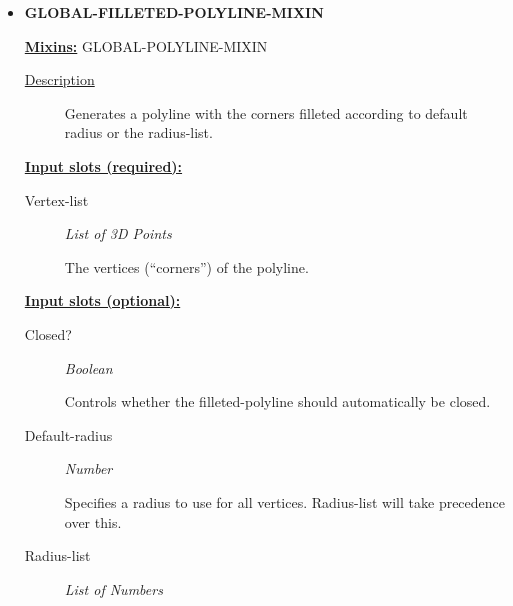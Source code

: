 \documentclass [11pt]{book}
\begin{document}
\begin{itemize}
\item {}
\label{prim:global-filleted-polyline-mixin}
\textbf{GLOBAL-FILLETED-POLYLINE-MIXIN}


\textbf{
\underline{Mixins:}} GLOBAL-POLYLINE-MIXIN





\begin{description}

\item [
\underline{Description}]


Generates a polyline with the corners filleted according to default radius or the radius-list.



\end{description}








\textbf{
\underline{Input slots (required):}}

\begin{description}

\item [Vertex-list]
\emph{List of 3D Points}

 The vertices (``corners'') of the polyline.




\end{description}






\textbf{
\underline{Input slots (optional):}}

\begin{description}

\item [Closed?]
\emph{Boolean}

 Controls whether the filleted-polyline should automatically be closed.




\item [Default-radius]
\emph{Number}

 Specifies a radius to use for all vertices. Radius-list will take precedence over this.




\item [Radius-list]
\emph{List of Numbers}


\end{description}
\end{itemize}
\end{document}
